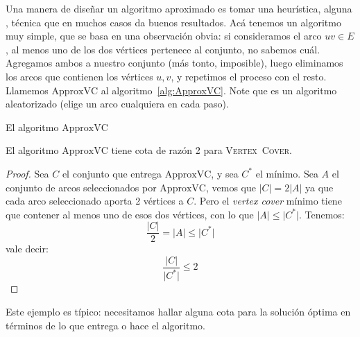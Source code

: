   Una manera de diseñar un algoritmo aproximado es tomar una heurística,
  alguna ,
  técnica que en muchos casos da buenos resultados.
  Acá tenemos un algoritmo muy simple,
  que se basa en una observación obvia:
  si consideramos el arco \(u v \in E\),
  al menos uno de los dos vértices pertenece al conjunto,
  no sabemos cuál.
  Agregamos ambos a nuestro conjunto
  (más tonto,
   imposible),
  luego eliminamos los arcos que contienen los vértices \(u, v\),
  y repetimos el proceso con el resto.
  Llamemos \(\mathrm{ApproxVC}\) al algoritmo~\ref{alg:ApproxVC}.
  Note que es un algoritmo aleatorizado
  (elige un arco cualquiera en cada paso).
  \begin{algorithm}[ht]
    \DontPrintSemicolon\Indp

    \caption{El algoritmo \(\mathrm{ApproxVC}\)}
    \label{alg:ApproxVC}
  \end{algorithm}
  \begin{proposition}
    \label{prop:ApproxVC}
    El algoritmo \(\mathrm{ApproxVC}\) tiene cota de razón \num{2}
    para \textsc{Vertex~Cover}.
  \end{proposition}
  \begin{proof}
    Sea \(C\) el conjunto que entrega \(\mathrm{ApproxVC}\),
    y sea \(C^*\) el mínimo.
    Sea \(A\) el conjunto de arcos
    seleccionados por \(\mathrm{ApproxVC}\),
    vemos que \(\lvert C \rvert = 2 \lvert A \rvert\)
    ya que cada arco seleccionado aporta \num{2} vértices a \(C\).
    Pero el \emph{\foreignlanguage{english}{vertex cover}} mínimo
    tiene que contener al menos uno de esos dos vértices,
    con lo que \(\lvert A \rvert \le \lvert C^* \rvert\).
    Tenemos:
    \begin{equation*}
      \frac{\lvert C \rvert}{2}
        = \lvert A \rvert
        \le \lvert C^* \rvert
    \end{equation*}
    vale decir:
    \begin{equation*}
      \frac{\lvert C \rvert}{\lvert C^* \rvert}
        \le 2
    \end{equation*}
    \qedhere
  \end{proof}
  Este ejemplo es típico:
  necesitamos hallar alguna cota para la solución óptima
  en términos de lo que entrega o hace el algoritmo.

